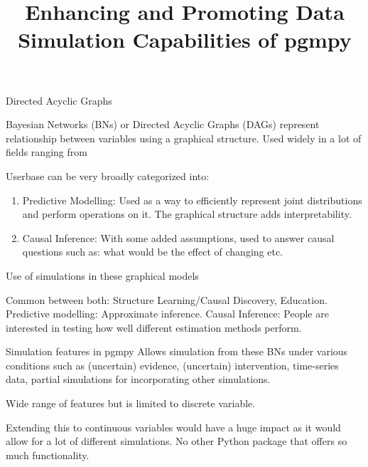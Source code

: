 \documentclass{beamer}
\begin{document}
\title[]{Enhancing and Promoting Data Simulation Capabilities of pgmpy}
\date{}

\maketitle

\begin{frame}{Directed Acyclic Graphs}


Bayesian Networks (BNs) or Directed Acyclic Graphs (DAGs) represent relationship between variables using a graphical structure. Used widely in a lot of fields ranging from %

Userbase can be very broadly categorized into: 
\begin{enumerate}
	\item Predictive Modelling: Used as a way to efficiently represent
		joint distributions and perform operations on it. The graphical
		structure adds interpretability.
	\item Causal Inference: With some added assumptions, used to answer
		causal questions such as: what would be the effect of changing etc.
\end{enumerate}

\end{frame}

\begin{frame}{Use of simulations in these graphical models}

Common between both: Structure Learning/Causal Discovery, Education.
Predictive modelling: Approximate inference.
Causal Inference: People are interested in testing how well different estimation methods perform.
\end{frame}

\begin{frame}{Simulation features in pgmpy}
	Allows simulation from these BNs under various conditions such as (uncertain) evidence, (uncertain) intervention, time-series data, partial simulations for incorporating other simulations.

	Wide range of features but is limited to discrete variable.

	Extending this to continuous variables would have a huge impact as it would allow for 
	a lot of different simulations. No other Python package that offers so much functionality.
\end{frame}
\end{document}
